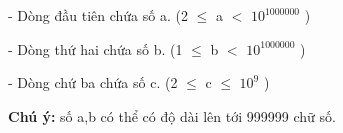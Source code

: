 - Dòng đầu tiên chứa số a. (2  $\le$  a $<$ $10^{1000000}$    )   



    - Dòng thứ hai chứa số b. (1  $\le$  b $<$ $10^{1000000}$    )   



    - Dòng chứ ba chứa số c. (2 $\le$ c $\le$ $10^{9}$    )   



\textbf{     Chú ý:    }    số a,b có thể có độ dài lên tới 999999 chữ số.